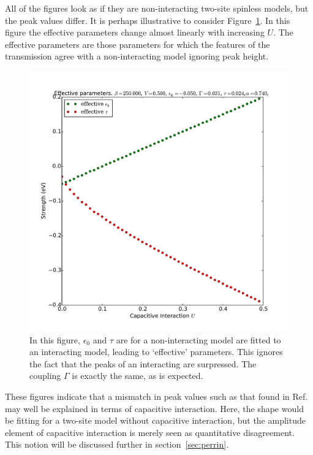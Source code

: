 All of the figures look as if they are non-interacting two-site spinless models, but the peak values differ. It is perhaps illustrative to consider Figure~\ref{fig:perrin_effective}. In this figure the effective parameters change almost linearly with increasing $U$. The effective parameters are those parameters for which the features of the transmission agree with a non-interacting model ignoring peak height.
\begin{figure}[!bt]
    \centering
    \includegraphics[height=.35\textheight]{pdf/trans/perrin_effective.pdf}
    \caption{In this figure, $\epsilon_0$ and $\tau$ are for a non-interacting model are fitted to an interacting model, leading to `effective' parameters. This ignores the fact that the peaks of an interacting are surpressed. The coupling $\Gamma$ is exactly the same, as is expected.}
    \label{fig:perrin_effective}
\end{figure}


These figures indicate that a mismatch in peak values such as that found in Ref.~\cite{perrinnano} may well be explained in terms of capacitive interaction. Here, the shape would be fitting for a two-site model without capacitive interaction, but the amplitude element of capacitive interaction is merely seen as quantitative disagreement. This notion will be discussed further in section~\ref{sec:perrin}. 

